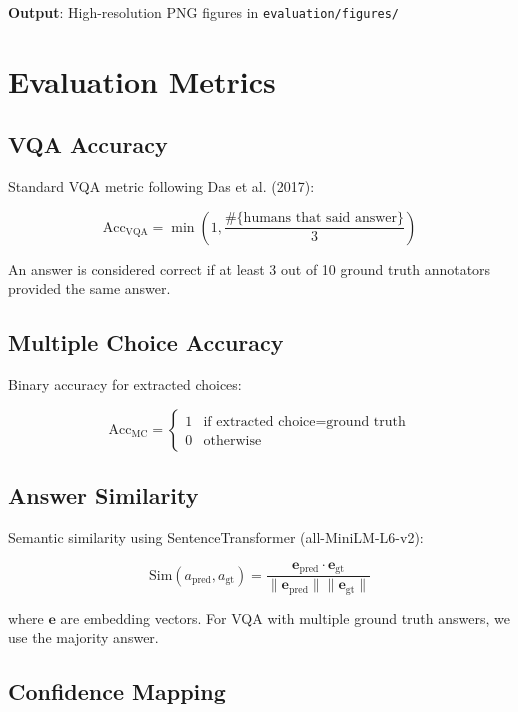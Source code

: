 \documentclass{article}
\begin{document}
\textbf{Output}: High-resolution PNG figures in \texttt{evaluation/figures/}

\section{Evaluation Metrics}

\subsection{VQA Accuracy}

Standard VQA metric following Das et al. (2017):

\begin{equation}
\text{Acc}_{\text{VQA}} = \min\left(1, \frac{\#\{\text{humans that said answer}\}}{3}\right)
\end{equation}

An answer is considered correct if at least 3 out of 10 ground truth annotators provided the same answer.

\subsection{Multiple Choice Accuracy}

Binary accuracy for extracted choices:

\begin{equation}
\text{Acc}_{\text{MC}} = \begin{cases}
1 & \text{if extracted choice} = \text{ground truth} \\
0 & \text{otherwise}
\end{cases}
\end{equation}

\subsection{Answer Similarity}

Semantic similarity using SentenceTransformer (all-MiniLM-L6-v2):

\begin{equation}
\text{Sim}(a_{\text{pred}}, a_{\text{gt}}) = \frac{\mathbf{e}_{\text{pred}} \cdot \mathbf{e}_{\text{gt}}}{\|\mathbf{e}_{\text{pred}}\| \|\mathbf{e}_{\text{gt}}\|}
\end{equation}

where $\mathbf{e}$ are embedding vectors. For VQA with multiple ground truth answers, we use the majority answer.

\subsection{Confidence Mapping}
\end{document}
